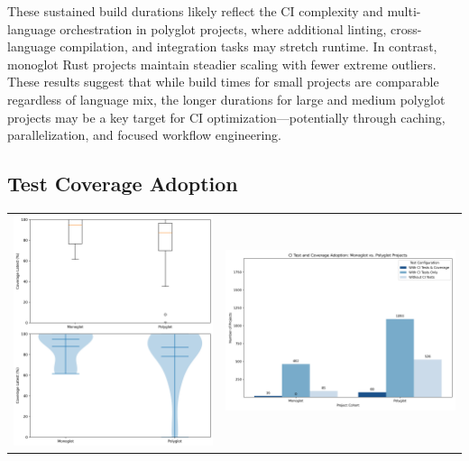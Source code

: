 \documentclass[11pt]{article}
\begin{document}
These sustained build durations likely reflect the CI complexity and multi-language orchestration in polyglot projects, where additional linting, cross-language compilation, and integration tasks may stretch runtime. In contrast, monoglot Rust projects maintain steadier scaling with fewer extreme outliers. These results suggest that while build times for small projects are comparable regardless of language mix, the longer durations for large and medium polyglot projects may be a key target for CI optimization—potentially through caching, parallelization, and focused workflow engineering.

\subsection{Test Coverage Adoption}
\begin{tabularx}{\linewidth}{@{}XX@{}}
\includegraphics[width=\linewidth]{figures/test_coverage.jpg} &
\includegraphics[width=\linewidth]{figures/ci_test_adoption.jpg} &
\end{tabularx}
\end{document}
